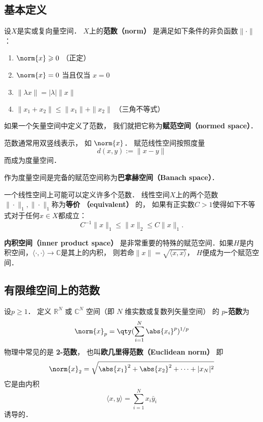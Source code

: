 

\subsection{基本定义}

设$X$是实或复向量空间． $X$上的\textbf{范数（norm）} 是满足如下条件的非负函数$\|\cdot\|$：
\begin{enumerate}
\item $\norm{x} \geqslant 0$ （正定）
\item $\norm{x} = 0$ 当且仅当 $x = 0$
\item $\|\lambda x\| = |\lambda|\|x\|$
\item $\|x_1+x_2\| \leqslant \|x_1\|+ \|x_2\|$ （三角不等式）
\end{enumerate}
如果一个矢量空间中定义了范数， 我们就把它称为\textbf{赋范空间（normed space）}．

范数通常用双竖线表示， 如 $\norm{x}$． 赋范线性空间按照度量
$$
d(x,y):=\|x-y\|
$$
而成为度量空间． 

作为度量空间是完备的赋范空间称为\textbf{巴拿赫空间（Banach space）}．%

一个线性空间上可能可以定义许多个范数． 线性空间$X$上的两个范数$\|\cdot\|_1,\|\cdot\|_1$称为\textbf{等价 （equivalent）} 的， 如果有正实数$C>1$使得如下不等式对于任何$x\in X$都成立：
$$
C^{-1}\|x\|_{1}\leq\|x\|_2\leq C\|x\|_1.
$$

\textbf{内积空间（inner product space）} 是非常重要的特殊的赋范空间．如果$H$是内积空间，$\langle\cdot,\cdot\rangle\to\mathbb C$是其上的内积， 则若命$\|x\|=\sqrt{\langle x,x\rangle }$， $H$便成为一个赋范空间．

\subsection{有限维空间上的范数}
设$p\geq1$． 定义 $\mathbb R^N$ 或 $\mathbb C^N$ 空间（即 $N$ 维实数或复数列矢量空间） 的 \textbf{$p$-范数}为
\begin{equation}
\norm{ x}_p = \qty(\sum_{i=1}^N \abs{x_i}^p)^{1/p}
\end{equation}
物理中常见的是 \textbf{2-范数}， 也叫\textbf{欧几里得范数（Euclidean norm）} 即
\begin{equation}
\norm{ x}_2 = \sqrt{\abs{x_1}^2 + \abs{x_2}^2 + \dots+|x_N|^2}
\end{equation}
它是由内积
$$
\langle x,y\rangle=\sum_{i=1}^Nx_i\bar y_i
$$
诱导的．

